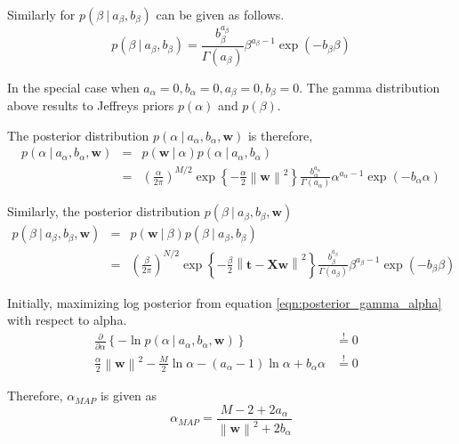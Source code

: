 \documentclass[11pt]{article}
\newcommand\given[1][]{\:#1\vert\:}
\newcommand{\norm}[1]{\left\lVert#1\right\rVert}
\begin{document}
Similarly for $p(\beta \given a_{\beta}, b_{\beta})$ can be given as follows.
\begin{equation}\label{gamma_beta}
    p(\beta \given a_{\beta}, b_{\beta}) =  \frac{b_{\beta}^{a_{\beta}}}{\Gamma(a_{\beta})}\beta^{a_{\beta}-1}\exp{(-b_{\beta}\beta)}
\end{equation}

In the special case when $a_{\alpha}=0, b_{\alpha}=0, a_{\beta} = 0, b_{\beta}=0$. The gamma distribution above results to Jeffreys priors $p(\alpha)$ and $p(\beta)$. 

The posterior distribution $p(\alpha \given a_{\alpha}, b_{\alpha}, \bm{w})$ is therefore,
\begin{eqnarray} \label{eqn:posterior_gamma_alpha}
    p(\alpha \given a_{\alpha}, b_{\alpha}, \bm{w}) 
    &=& p(\bm{w} \given \alpha)p(\alpha \given a_{\alpha}, b_{\alpha})\\
    &=& \left( \frac{\alpha}{2\pi}\right)^{M/2} \exp{\left\{ -\frac{\alpha}{2}\norm{\bm{w}}^2\right\}}\frac{b_{\alpha}^{a_{\alpha}}}{\Gamma(a_{\alpha})}\alpha^{a_{\alpha}-1}\exp{(-b_{\alpha}\alpha)}
\end{eqnarray}

Similarly, the posterior distribution $p(\beta \given a_{\beta}, b_{\beta}, \bm{w})$
\begin{eqnarray}\label{eqn:posterior_gamma_beta}
    p(\beta \given a_{\beta}, b_{\beta}, \bm{w}) 
    &=& p(\bm{w} \given \beta)p(\beta \given a_{\beta}, b_{\beta})\\
    &=& \left( \frac{\beta}{2\pi}\right)^{N/2}\exp\left\{-\frac{\beta}{2}\norm{\bm{t}-\bm{X}\bm{w}}^2 \right\}\frac{b_{\beta}^{a_{\beta}}}{\Gamma(a_{\beta})}\beta^{a_{\beta}-1}\exp{(-b_{\beta}\beta)}
\end{eqnarray}

Initially, maximizing log posterior from equation \ref{eqn:posterior_gamma_alpha} with respect to alpha.
\begin{eqnarray}
    \frac{\partial }{\partial  \alpha} \left\{ -\ln{p(\alpha \given a_{\alpha}, b_{\alpha}, \bm{w})} \right\}
    &\overset{!}{=} 0&  \\
    \frac{\alpha}{2}\norm{\bm{w}}^2 - \frac{M}{2}\ln{\alpha} - \left( a_{\alpha} - 1 \right)\ln{\alpha} + b_{\alpha}\alpha
    &\overset{!}{=} 0&
\end{eqnarray}

Therefore, $\alpha_{MAP}$ is given as 
\begin{equation} \label{eqn:alpha_map_gamma}
    \alpha_{MAP} = \frac{M-2 + 2a_{\alpha}}{\norm{\bm{w}}^2+2b_{\alpha}}
\end{equation}
\end{document}
